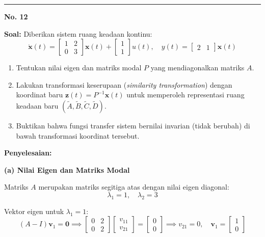 \documentclass[11pt,a4paper]{article}
\begin{document}
\vspace{12pt}
\hrule
\vspace{10pt}

\textbf{\large No. 12}

\textbf{Soal:}  
Diberikan sistem ruang keadaan kontinu:
$$\dot{\mathbf{x}}(t) = \begin{bmatrix} 1 & 2 \\ 0 & 3 \end{bmatrix} \mathbf{x}(t) + \begin{bmatrix} 1 \\ 1 \end{bmatrix} u(t), \quad y(t) = \begin{bmatrix} 2 & 1 \end{bmatrix} \mathbf{x}(t)$$
\begin{enumerate}[label=(\alph*)]
    \item Tentukan nilai eigen dan matriks modal $P$ yang mendiagonalkan matriks $A$.
    \item Lakukan transformasi keserupaan (\textit{similarity transformation}) dengan koordinat baru $\mathbf{z}(t) = P^{-1}\mathbf{x}(t)$ untuk memperoleh representasi ruang keadaan baru $(\tilde{A}, \tilde{B}, \tilde{C}, \tilde{D})$.
    \item Buktikan bahwa fungsi transfer sistem bernilai invarian (tidak berubah) di bawah transformasi koordinat tersebut.
\end{enumerate}

\textbf{Penyelesaian:}

\textbf{(a) Nilai Eigen dan Matriks Modal}

Matriks $A$ merupakan matriks segitiga atas dengan nilai eigen diagonal:
$$\lambda_1 = 1, \quad \lambda_2 = 3$$

Vektor eigen untuk $\lambda_1 = 1$:
$$(A - I)\mathbf{v}_1 = \mathbf{0} \implies \begin{bmatrix} 0 & 2 \\ 0 & 2 \end{bmatrix} \begin{bmatrix} v_{11} \\ v_{21} \end{bmatrix} = \begin{bmatrix} 0 \\ 0 \end{bmatrix} \implies v_{21} = 0, \quad \mathbf{v}_1 = \begin{bmatrix} 1 \\ 0 \end{bmatrix}$$
\end{document}
